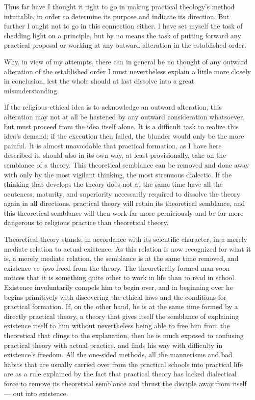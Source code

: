 \documentclass[12pt,a4paper]{book}
\begin{document}
Thus far have I thought it right to go in making practical theology's method intuitable, in order to
determine its purpose and indicate its direction. But further I ought not to go in this connection either.
I have set myself the task of shedding light on a principle, but by no means the task of putting forward
any practical proposal or working at any outward alteration in the established order.

Why, in view of my attempts, there can in general be no
thought of any outward alteration of the established order I must nevertheless explain a little more
closely in conclusion, lest the whole should at last dissolve into a great misunderstanding.

If the religious-ethical idea is to acknowledge an outward alteration, this alteration may not at all be
hastened by any outward consideration whatsoever, but must proceed from the idea itself alone. It is a
difficult task to realize this idea's demand; if the execution then failed, the blunder would only be the
more painful. It is almost unavoidable that practical formation, as I have here described it, should also
in its own way, at least provisionally, take on the semblance of a theory. This theoretical semblance can
be removed and done away with only by the most vigilant thinking, the most strenuous dialectic. If the
thinking that develops the theory does not at the same time have all the acuteness, maturity, and
superiority necessarily required to dissolve the theory again in all directions, practical theory will
retain its theoretical semblance, and this theoretical semblance will then work far more perniciously and
be far more dangerous to religious practice than theoretical theory.

Theoretical theory stands, in accordance with its scientific character, in a merely mediate relation to
actual existence. As this relation is now recognized for what it is, a merely mediate relation, the
semblance is at the same time removed, and existence \textit{eo ipso} freed from the theory. The
theoretically formed man soon notices that it is something quite other to work in life than to read in
school. Existence involuntarily compels him to begin over, and in beginning over he begins primitively
with discovering the ethical laws and the conditions for practical formation. If, on the other hand, he is
at the same time formed by a directly practical theory, a theory that gives itself the semblance of
explaining existence itself to him without nevertheless being able to free him from the theoretical that
clings to the explanation, then he is much
exposed to confusing practical theory with actual practice, and finds his way with difficulty in
existence's freedom. All the one-sided methods, all the mannerisms and bad habits that are usually carried
over from the practical schools into practical life are as a rule explained by the fact that practical
theory has lacked dialectical force to remove its theoretical semblance and thrust the disciple away from
itself --- out into existence.
\end{document}
